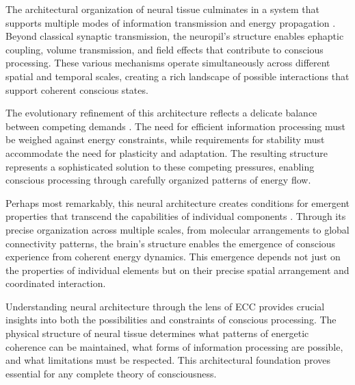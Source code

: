 The architectural organization of neural tissue culminates in a system that supports multiple modes of information transmission and energy propagation \cite{VanEssen2018}. Beyond classical synaptic transmission, the neuropil's structure enables ephaptic coupling, volume transmission, and field effects that contribute to conscious processing. These various mechanisms operate simultaneously across different spatial and temporal scales, creating a rich landscape of possible interactions that support coherent conscious states.

The evolutionary refinement of this architecture reflects a delicate balance between competing demands \cite{Hilgetag2020}. The need for efficient information processing must be weighed against energy constraints, while requirements for stability must accommodate the need for plasticity and adaptation. The resulting structure represents a sophisticated solution to these competing pressures, enabling conscious processing through carefully organized patterns of energy flow.

Perhaps most remarkably, this neural architecture creates conditions for emergent properties that transcend the capabilities of individual components \cite{vonBartheld2016}. Through its precise organization across multiple scales, from molecular arrangements to global connectivity patterns, the brain's structure enables the emergence of conscious experience from coherent energy dynamics. This emergence depends not just on the properties of individual elements but on their precise spatial arrangement and coordinated interaction.

Understanding neural architecture through the lens of ECC provides crucial insights into both the possibilities and constraints of conscious processing. The physical structure of neural tissue determines what patterns of energetic coherence can be maintained, what forms of information processing are possible, and what limitations must be respected. This architectural foundation proves essential for any complete theory of consciousness.
